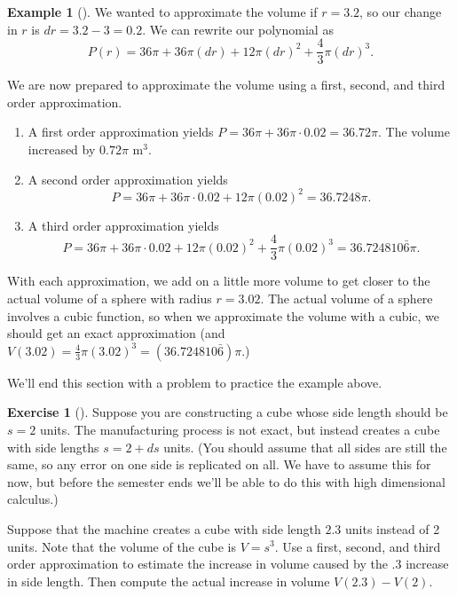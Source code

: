 \documentclass[10pt,]{book}
\theoremstyle{plain}
\theoremstyle{definition}
\theoremstyle{definition}
\theoremstyle{definition}
\newtheorem{example}[theorem]{Example}
\theoremstyle{definition}
\newtheorem{exploration}[project]{Exercise}
\theoremstyle{definition}
\numberwithin{equation}{section}
\begin{document}
\begin{example}[]
%
\par
We wanted to approximate the volume if \(r=3.2\), so our change in \(r\) is \(dr=3.2-3=0.2\). We can rewrite our polynomial as%
\begin{equation*}
P(r)=36\pi+36\pi(dr)+12\pi(dr)^2+\frac{4}{3}\pi(dr)^3.
\end{equation*}
%
\par
We are now prepared to approximate the volume using a first, second, and third order approximation. \leavevmode%
\begin{enumerate}
\item\hypertarget{li-12}{}A first order approximation yields \(P=36\pi+ 36\pi\cdot 0.02 =36.72\pi.\) The volume increased by \(0.72\pi\) m\(^3\).%
\item\hypertarget{li-13}{}A second order approximation yields%
\begin{equation*}
P=36\pi+ 36\pi\cdot 0.02 +12\pi (0.02)^2 =36.7248\pi.
\end{equation*}
%
\item\hypertarget{li-14}{}A third order approximation yields%
\begin{equation*}
P=36\pi+36\pi\cdot 0.02 +12\pi (0.02)^2+\frac{4}{3}\pi(0.02)^3  =36.724810\bar6\pi.
\end{equation*}
%
\end{enumerate}
%
\par
With each approximation, we add on a little more volume to get closer to the actual volume of a sphere with radius \(r=3.02\). The actual volume of a sphere involves a cubic function, so when we approximate the volume with a cubic, we should get an exact approximation (and \(V(3.02) = \frac 43 \pi (3.02)^3 =(36.724810\bar6)\pi\).)%
\end{example}
We'll end this section with a problem to practice the example above.%
\begin{exploration}[]\label{exploration-18}
Suppose you are constructing a cube whose side length should be \(s=2\) units. The manufacturing process is not exact, but instead creates a cube with side lengths \(s=2+ds\) units. (You should assume that all sides are still the same, so any error on one side is replicated on all. We have to assume this for now, but before the semester ends we'll be able to do this with high dimensional calculus.)%
\par
Suppose that the machine creates a cube with side length \(2.3\) units instead of 2 units. Note that the volume of the cube is \(V=s^3\). Use a first, second, and third order approximation to estimate the increase in volume caused by the .3 increase in side length. Then compute the actual increase in volume \(V(2.3)-V(2)\).%
\end{exploration}
\typeout{************************************************}
\typeout{************************************************}
\end{document}

